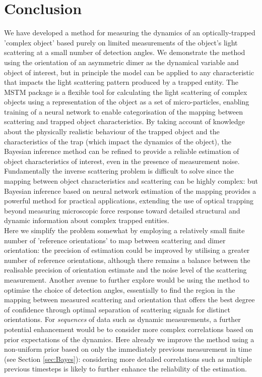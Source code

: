 \documentclass[final,  3p]{elsarticle}
\begin{document}
\section{Conclusion}
\label{sec:Conclusion}

We have developed a method for measuring the dynamics of an optically-trapped 'complex object' based purely on limited measurements of the object's light scattering at a small number of detection angles. We demonstrate the method using the orientation of an asymmetric dimer as the dynamical variable and object of interest, but in principle the model can be applied to any characteristic that impacts the light scattering pattern produced by a trapped entity. The MSTM package is a flexible tool for calculating the light scattering of complex objects using a representation of the object as a set of micro-particles, enabling training of a neural network to enable categorisation of the mapping between scattering and trapped object characteristics. By taking account of knowledge about the physically realistic behaviour of the trapped object and the characteristics of the trap (which impact the dynamics of the object), the Bayesian inference method can be refined to provide a reliable estimation of object characteristics of interest, even in the presence of measurement noise. Fundamentally the inverse scattering problem is difficult to solve since the mapping between object characteristics and scattering can be highly complex: but Bayesian inference based on neural network estimation of the mapping provides a powerful method for practical applications, extending the use of optical trapping beyond measuring microscopic force response toward detailed structural and dynamic information about complex trapped entities.\\

Here we simplify the problem somewhat by employing a relatively small finite number of 'reference orientations' to map between scattering and dimer orientation: the precision of estimation could be improved by utilising a greater number of reference orientations, although there remains a balance between the realisable precision of orientation estimate and the noise level of the scattering measurement. Another avenue to further explore would be using the method to optimise the choice of detection angles, essentially to find the region in the mapping between measured scattering and orientation that offers the best degree of confidence through optimal separation of scattering signals for distinct orientations. For \textit{sequences} of data such as dynamic measurements, a further potential enhancement would be to consider more complex correlations based on prior expectations of the dynamics. Here already we improve the method using a non-uniform prior based on only the immediately previous measurement in time (see Section \ref{sec:Bayes}): considering more detailed correlations such as multiple previous timesteps is likely to further enhance the reliability of the estimation.
\end{document}
